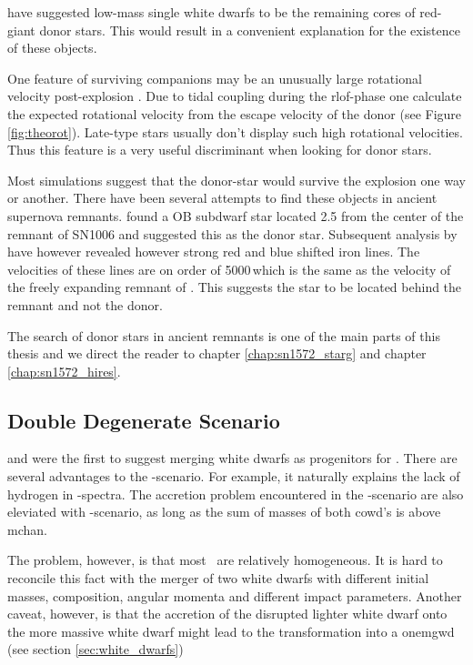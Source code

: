 \cite{2009A&A...493.1081J} have suggested low-mass single white dwarfs to be the remaining cores of red-giant donor stars. This would result in a convenient explanation for the existence of these objects. 

One feature of surviving companions may be an unusually large rotational velocity post-explosion \citep[][chapter \ref{ch:sn1572_starg} of this work]{2009ApJ...701.1665K}. Due to tidal coupling during the \gls{rlof}-phase one calculate the expected rotational velocity from the escape velocity of the donor (see Figure \ref{fig:theorot}). Late-type stars usually don't display such high rotational velocities. Thus this feature is a very useful discriminant when looking for donor stars. 

Most simulations suggest that the donor-star would survive the explosion one way or another. There have been several attempts to find these objects in ancient supernova remnants. \citet{1980ApJ...241.1039S} found a OB subdwarf star located 2.5 \arcmin from the center of the remnant of SN1006 and suggested this as the donor star. Subsequent analysis by \cite{1997ApJ...477L..53W, 1983ApJ...269L...5W} have however revealed however strong red and blue shifted iron lines. The velocities of these lines are on order of 5000\,\kms which is the same as the velocity of the freely expanding remnant of . This suggests the star to be located behind the remnant and not the donor.
 
The search of donor stars in ancient remnants is one of the main parts of this thesis and we direct the reader to chapter \ref{chap:sn1572_starg} and chapter \ref{chap:sn1572_hires}.



\subsection{Double Degenerate Scenario}
\citet{1984ApJ...277..355W} and \citet{1984ApJS...54..335I} were the first to suggest merging white dwarfs as progenitors for \snia. There are several advantages to the \dd-scenario. For example, it naturally explains the lack of hydrogen in \snia-spectra. The accretion problem encountered in the \sd-scenario are also eleviated with \dd-scenario, as long as the sum of masses of both \gls{cowd}'s is above \gls{mchan}. 

The problem, however, is that most \snia\ are relatively homogeneous. It is hard to reconcile this fact with the merger of two white dwarfs with different initial masses, composition, angular momenta and different impact parameters. Another caveat, however, is that the accretion of the disrupted lighter white dwarf onto the more massive white dwarf might lead to the transformation into a \gls{onemgwd} (see section \ref{sec:white_dwarfs})

